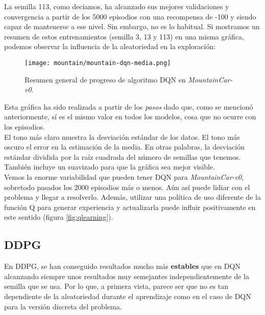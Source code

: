 \documentclass[11pt,fleqn]{book} %
\begin{document}
La semilla 113, como decíamos, ha alcanzado sus mejores validaciones y convergencia a partir de los 5000 episodios con una recompensa de -100 y siendo capaz de mantenerse a ese nivel. Sin embargo, no es lo habitual. Si mostramos un resumen de estos entrenamientos (semilla 3, 13 y 113) en una misma gráfica, podemos observar la influencia de la aleatoriedad en la exploración:

\begin{figure}[H]
	\centering\texttt{[image: mountain/mountain-dqn-media.png]}
	\caption{Resumen general de progreso de algoritmo DQN en \textit{MountainCar-v0}.}
	\label{fig:mountainDQNmedia} %
\end{figure} 

Esta gráfica ha sido realizada a partir de los \textit{pasos} dado que, como se mencionó anteriormente, sí es el mismo valor en todos los modelos, cosa que no ocurre con los episodios. \\

El tono más claro muestra la desviación estándar de los datos. El tono más oscuro el error en la estimación de la media. En otras palabras, la desviación estándar dividida por la raíz cuadrada del número de semillas que tenemos. También incluye un suavizado para que la gráfica sea mejor visible. \\

Vemos la enorme variabilidad que pueden tener DQN para \textit{MountainCar-v0}, sobretodo pasados los 2000 episodios más o menos. Aún así puede lidiar con el problema y llegar a resolverlo. Además, utilizar una política de uso diferente de la función Q para generar experiencia y actualizarla puede influir positivamente en este sentido (figura \ref{fig:qlearning}).

\subsection{DDPG}

En DDPG, se han conseguido resultados mucho más \textbf{estables} que en DQN alcanzando siempre unos resultados muy semejantes independientemente de la semilla que se usa. Por lo que, a primera vista, parece ser que no es tan dependiente de la aleatoriedad durante el aprendizaje como en el caso de DQN para la versión discreta del problema. \\
\end{document}
